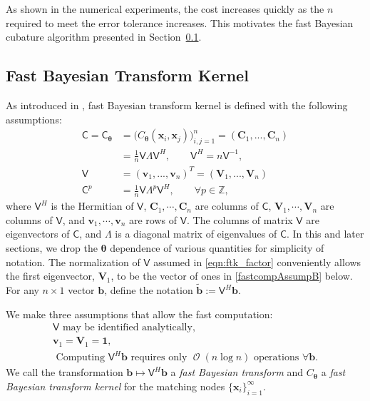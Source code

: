 \documentclass{svjour3}                     %
\DeclareMathOperator{\Order}{{\mathcal O}}
\newcommand{\bm}[1]{\boldsymbol{#1}}
\newcommand{\integers}{\mathbb{Z}}
\newcommand{\vtheta}{{\bm{\theta}}}
\newcommand{\vb}{\bm{b}}
\newcommand{\vC}{\bm{C}}
\newcommand{\vv}{\bm{v}}
\newcommand{\vV}{\bm{V}}
\newcommand{\vx}{\bm{x}}
\newcommand{\vone}{\bm{1}}
\newcommand{\mC}{\mathsf{C}}
\newcommand{\mCtheta}{{\mathsf{C}_{\vtheta}}}
\newcommand{\mLambda}{\mathsf{\Lambda}}
\newcommand{\mV}{\mathsf{V}}
\begin{document}
As shown in the numerical experiments, the cost increases quickly as the $n$ required to meet the error tolerance increases.  This motivates the fast Bayesian cubature algorithm presented in Section~\ref{sec:fast_BC}.





















\subsection{Fast Bayesian Transform Kernel}
\label{sec:fast_BC}

As introduced in \cite{JagHic19a}, fast Bayesian transform kernel is defined with the following assumptions:
\begin{align}
\nonumber
\mC = \mCtheta &= \Big(C_\vtheta(\vx_i,\vx_j)\Big)_{i,j=1}^n  = (\vC_1,...,\vC_n) 
\\
\label{eqn:ftk_factor}
&= \frac 1n \mV \mLambda \mV^H , 
\quad \quad \mV^H = n \mV^{-1}, \\
\nonumber
\mV &= (\vv_1,...,\vv_n)^T = (\vV_1,...,\vV_n) \\
\nonumber
\mC^p  &= \frac 1n \mV \mLambda^{p} \mV^H, \qquad \forall p \in \integers,
\end{align}
where $\mV^H$ is the Hermitian of $\mV$, $\vC_1,\cdots,\vC_n$ are columns of $\mC$,  $\vV_1,\cdots,\vV_n$ are columns of $\mV$, and $\vv_1,\cdots,\vv_n$ are rows of $\mV$. 
The columns of matrix $\mV$ are eigenvectors of $\mC$, and $\mLambda$ is a diagonal matrix of eigenvalues of $\mC$.
In this and later sections, we drop the $\vtheta$ dependence of various quantities for simplicity of notation.  The normalization of $\mV$ assumed in \eqref{eqn:ftk_factor} conveniently allows the first eigenvector, $\vV_1$, to be the vector of ones in \eqref{fastcompAssumpB} below.  
For any $n \times 1$ vector $\vb$, define the notation  $\widetilde{\vb} := \mV^H \vb$.


We make three assumptions that allow the fast computation:
\begin{subequations} \label{fastcompAssump}
	\begin{gather}
	\label{fastcompAssumpA}
	\mV \text{ may be identified analytically}, \\
	\label{fastcompAssumpB}
	\vv_1 = \vV_1 = \vone, \\
	\label{fastcompAssumpC}
	\text{ Computing $\mV^H \vb$ requires only $\Order(n \log n)$ operations } \forall \vb.
	\end{gather}
\end{subequations}
We call the transformation $\vb \mapsto \mV^H \vb$ a \emph{fast Bayesian transform} and $C_\vtheta$ a \emph{fast Bayesian transform kernel} for the matching nodes $\{\vx_i\}_{i=1}^\infty$.  
\end{document}
